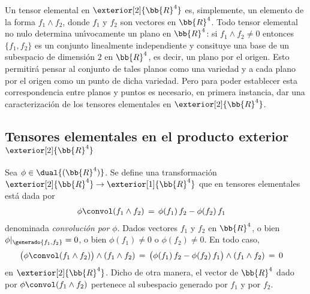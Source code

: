 \theoremstyle{plain}
\newtheorem{teoEquivalenciasTensoresElementalesRCuatro}{Teorema}[section]
\newtheorem{coroTensoresElementalesRTres}%
	[teoEquivalenciasTensoresElementalesRCuatro]{Corolario}

\theoremstyle{remark}


Un tensor elemental en $\exterior[2]{\bb{R}^{4}}$ es, simplemente, un
elemento de la forma $f_{1}\wedge f_{2}$, donde $f_{1}$ y $f_{2}$ son
vectores en $\bb{R}^{4}$. Todo tensor elemental no nulo determina
un\'{\i}vocamente un plano en $\bb{R}^{4}$: si $f_{1}\wedge f_{2}\not =0$
entonces $\{f_{1},f_{2}\}$ es un conjunto linealmente independiente y
consituye una base de un subespacio de dimensi\'{o}n $2$ en $\bb{R}^{4}$,
es decir, un plano por el origen. Esto permitir\'{a} pensar al conjunto
de tales planos como una variedad y a cada plano por el origen como
un punto de dicha variedad. Pero para poder establecer esta correspondencia
entre planos y puntos es necesario, en primera instancia, dar una
caracterizaci\'{o}n de los tensores elementales en $\exterior[2]{\bb{R}^{4}}$.

\subsection{Tensores elementales en el producto exterior %
	$\exterior[2]{\bb{R}^{4}}$}
Sea $\phi\in\dual{(\bb{R}^{4})}$. Se define una transformaci\'{o}n
$\exterior[2]{\bb{R}^{4}}\rightarrow\exterior[1]{\bb{R}^{4}}$ que en
tensores elementales est\'{a} dada por
\begin{align*}
	\phi\convol (f_{1}\wedge f_{2}) & \,=\,
		\phi(f_{1})\,f_{2}-\phi(f_{2})\,f_{1}
\end{align*}
%
denominada \emph{convoluci\'{o}n por $\phi$}. Dados vectores $f_{1}$ y
$f_{2}$ en $\bb{R}^{4}$, o bien $\phi|_{\generado{f_{1},f_{2}}}=0$, o bien
$\phi(f_{1})\not =0$ o $\phi(f_{2})\not=0$. En todo caso,
\begin{align*}
	\big(\phi\convol(f_{1}\wedge f_{2})\big)\wedge (f_{1}\wedge f_{2}) &
		\,=\,\big(\phi(f_{1})\,f_{2}-\phi(f_{2})\,f_{1}\big)\wedge
			(f_{1}\wedge f_{2}) \,=\,0
\end{align*}
%
en $\exterior[2]{\bb{R}^{4}}$. Dicho de otra manera, el vector de $\bb{R}^{4}$
dado por $\phi\convol(f_{1}\wedge f_{2})$ pertenece al subespacio generado
por $f_{1}$ y por $f_{2}$.

